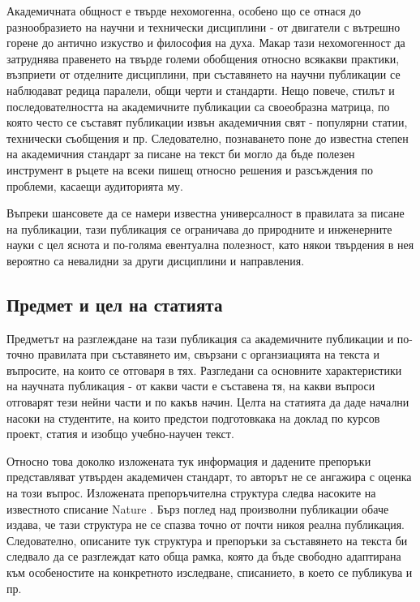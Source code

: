 \documentclass[11pt, oneside]{article}     %
\begin{document}
Академичната общност е твърде нехомогенна, особено що се отнася до разнообразието на научни и технически дисциплини - от двигатели с вътрешно горене до антично изкуство и философия на духа. Макар тази  нехомогенност да затруднява правенето на твърде големи обобщения относно всякакви практики, възприети от отделните дисциплини, при съставянето на научни публикации се наблюдават редица паралели,  общи черти и стандарти. Нещо повече, стилът и последователността на академичните публикации са своеобразна матрица, по която често се съставят публикации извън академичния свят - популярни статии, технически съобщения и пр. Следователно, познаването поне до известна степен на академичния стандарт за писане на текст би могло да бъде полезен инструмент в ръцете на всеки пишещ относно решения и разсъждения по проблеми, касаещи аудиторията му. 

Въпреки шансовете да се намери известна универсалност в правилата за писане на публикации, тази публикация се ограничава до природните и инженерните науки с цел яснота и по-голяма евентуална полезност, като някои твърдения в нея вероятно са невалидни за други дисциплини и направления.
 
\subsection*{Предмет и цел на статията}

Предметът на разглеждане на тази публикация са академичните публикации и по-точно правилата при съставянето им, свързани с органзиацията на текста и въпросите, на които се отговаря в тях. Разгледани са основните характеристики на научната публикация - от какви части е съставена тя, на какви въпроси отговарят тези нейни части и по какъв начин. Целта на статията да даде начални насоки на студентите, на които предстои подготовкака на доклад по курсов проект, статия и изобщо учебно-научен текст.

Относно това доколко изложената тук информация и дадените препоръки представляват утвърден академичен стандарт, то авторът не се ангажира с оценка на този въпрос. Изложената препоръчителна структура следва насоките на известното списание Nature \cite{nature}. Бърз поглед над произволни публикации обаче издава, че тази структура не се спазва точно от почти никоя реална публикация. Следователно, описаните тук структура и препоръки за съставянето на текста би следвало да се разглеждат като обща рамка, която да бъде свободно адаптирана към особеностите на конкретното изследване, списанието, в което се публикува и пр.
\end{document}
